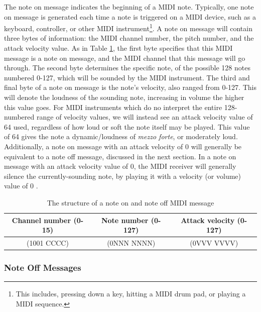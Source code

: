 The note on message indicates the beginning of a MIDI note. Typically, one note on message is generated each time a note is triggered on a MIDI device, such as a keyboard, controller, or other MIDI instrument\footnote{This includes, pressing down a key, hitting a MIDI drum pad, or playing a MIDI sequence.}. A note on message will contain three bytes of information: the MIDI channel number, the pitch number, and the attack velocity value. As in Table \ref{tbl:byte-structure-note-on}, the first byte specifies that this MIDI message is a note on message, and the MIDI channel that this message will go through. The second byte determines the specific note, of the possible 128 notes numbered 0-127, which will be sounded by the MIDI instrument. The third and final byte of a note on message is the note's velocity, also ranged from 0-127. This will denote the loudness of the sounding note, increasing in volume the higher this value goes. For MIDI instruments which do no interpret the entire 128-numbered range of velocity values, we will instead see an attack velocity value of 64 used, regardless of how loud or soft the note itself may be played. This value of 64 gives the note a dynamic/loudness of \textit{mezzo forte}, or moderately loud. Additionally, a note on message with an attack velocity of 0 will generally be equivalent to a note off message, discussed in the next section. In a note on message with an attack velocity value of 0, the MIDI receiver will generally silence the currently-sounding note, by playing it with a velocity (or volume) value of 0 \cite{Huber_2012}.

\begin{table}
	\centering
	\begin{tabular}{|c|c|c|}
	\hline
		Channel number (0-15) & Note number (0-127) & Attack velocity (0-127) \\
		\hline
		(1001 CCCC) & (0NNN NNNN) & (0VVV VVVV) \\
	\hline
	\end{tabular}
	\caption{The structure of a note on and note off MIDI message}
	\label{tbl:byte-structure-note-on}
\end{table}

\subsubsection{Note Off Messages}


